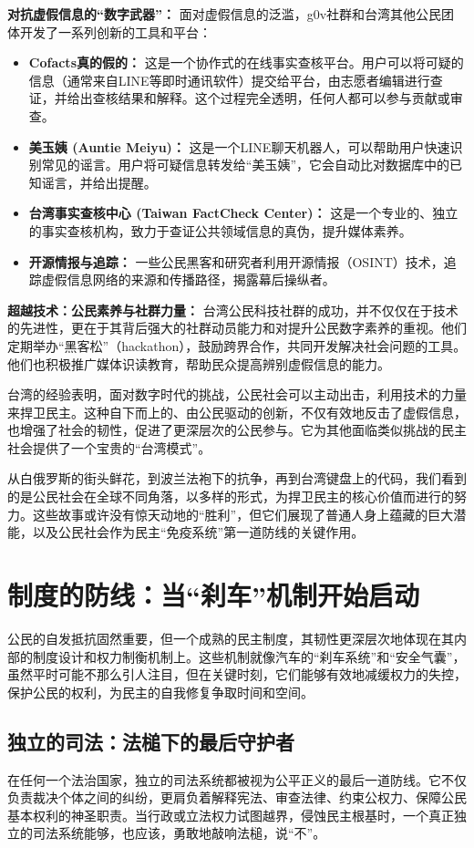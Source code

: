 \documentclass[UTF8, 10pt]{ctexbook}
\begin{document}
\textbf{对抗虚假信息的“数字武器”：} 面对虚假信息的泛滥，g0v社群和台湾其他公民团体开发了一系列创新的工具和平台：
\begin{itemize}
    \item \textbf{Cofacts真的假的：} 这是一个协作式的在线事实查核平台。用户可以将可疑的信息（通常来自LINE等即时通讯软件）提交给平台，由志愿者编辑进行查证，并给出查核结果和解释。这个过程完全透明，任何人都可以参与贡献或审查。
    \item \textbf{美玉姨 (Auntie Meiyu)：} 这是一个LINE聊天机器人，可以帮助用户快速识别常见的谣言。用户将可疑信息转发给“美玉姨”，它会自动比对数据库中的已知谣言，并给出提醒。
    \item \textbf{台湾事实查核中心 (Taiwan FactCheck Center)：} 这是一个专业的、独立的事实查核机构，致力于查证公共领域信息的真伪，提升媒体素养。
    \item \textbf{开源情报与追踪：} 一些公民黑客和研究者利用开源情报（OSINT）技术，追踪虚假信息网络的来源和传播路径，揭露幕后操纵者。
\end{itemize}

\textbf{超越技术：公民素养与社群力量：} 台湾公民科技社群的成功，并不仅仅在于技术的先进性，更在于其背后强大的社群动员能力和对提升公民数字素养的重视。他们定期举办“黑客松”（hackathon），鼓励跨界合作，共同开发解决社会问题的工具。他们也积极推广媒体识读教育，帮助民众提高辨别虚假信息的能力。

台湾的经验表明，面对数字时代的挑战，公民社会可以主动出击，利用技术的力量来捍卫民主。这种自下而上的、由公民驱动的创新，不仅有效地反击了虚假信息，也增强了社会的韧性，促进了更深层次的公民参与。它为其他面临类似挑战的民主社会提供了一个宝贵的“台湾模式”。

从白俄罗斯的街头鲜花，到波兰法袍下的抗争，再到台湾键盘上的代码，我们看到的是公民社会在全球不同角落，以多样的形式，为捍卫民主的核心价值而进行的努力。这些故事或许没有惊天动地的“胜利”，但它们展现了普通人身上蕴藏的巨大潜能，以及公民社会作为民主“免疫系统”第一道防线的关键作用。

\section{制度的防线：当“刹车”机制开始启动}
\lettrine[lines=2]{公}{民}的自发抵抗固然重要，但一个成熟的民主制度，其韧性更深层次地体现在其内部的制度设计和权力制衡机制上。这些机制就像汽车的“刹车系统”和“安全气囊”，虽然平时可能不那么引人注目，但在关键时刻，它们能够有效地减缓权力的失控，保护公民的权利，为民主的自我修复争取时间和空间。

\subsection{独立的司法：法槌下的最后守护者}
在任何一个法治国家，独立的司法系统都被视为公平正义的最后一道防线。它不仅负责裁决个体之间的纠纷，更肩负着解释宪法、审查法律、约束公权力、保障公民基本权利的神圣职责。当行政或立法权力试图越界，侵蚀民主根基时，一个真正独立的司法系统能够，也应该，勇敢地敲响法槌，说“不”。
\end{document}
